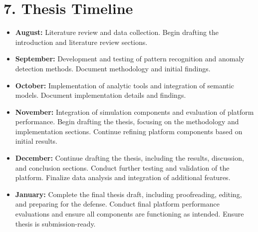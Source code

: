 \documentclass[11pt]{article}
\begin{document}
\section*{7. Thesis Timeline}
\begin{itemize}
    \item \textbf{August:} Literature review and data collection. Begin drafting the introduction and literature review sections.
    \item \textbf{September:} Development and testing of pattern recognition and anomaly detection methods. Document methodology and initial findings.
    \item \textbf{October:} Implementation of analytic tools and integration of semantic models. Document implementation details and findings.
    \item \textbf{November:} Integration of simulation components and evaluation of platform performance. Begin drafting the thesis, focusing on the methodology and implementation sections. Continue refining platform components based on initial results.
    \item \textbf{December:} Continue drafting the thesis, including the results, discussion, and conclusion sections. Conduct further testing and validation of the platform. Finalize data analysis and integration of additional features.
    \item \textbf{January:} Complete the final thesis draft, including proofreading, editing, and preparing for the defense. Conduct final platform performance evaluations and ensure all components are functioning as intended. Ensure thesis is submission-ready.
\end{itemize}
\end{document}
